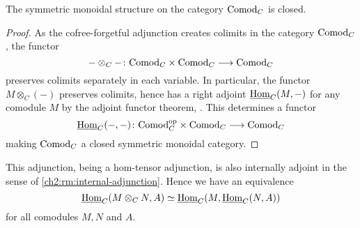 \begin{lemma}
    The symmetric monoidal structure on the category $\mathrm{Comod}_C$ is closed. 
\end{lemma}
\begin{proof}
    As the cofree-forgetful adjunction creates colimits in the category $\mathrm{Comod}_C$, the functor 
    \[-\otimes_C- \colon \mathrm{Comod}_C \times \mathrm{Comod}_C \longrightarrow \mathrm{Comod}_C\] 
    preserves colimits separately in each variable. In particular, the functor $M\otimes_C (-)$ preserves colimits, hence has a right adjoint $\operatorname{\underline{Hom}}_C(M,-)$ for any comodule $M$ by the adjoint functor theorem, \cite[5.5.2.9]{lurie_09}. This determines a functor 
    \[\operatorname{\underline{Hom}}_C(-,-)\colon \mathrm{Comod}_C^{\mathrm{op}}\times \mathrm{Comod}_C\longrightarrow \mathrm{Comod}_C\]
    making $\mathrm{Comod}_C$ a closed symmetric monoidal category.  
\end{proof}

\begin{remark}
    This adjunction, being a hom-tensor adjunction, is also internally adjoint in the sense of \cref{ch2:rm:internal-adjunction}. Hence we have an equivalence 
    \[\operatorname{\underline{Hom}}_C(M\otimes_C N, A) \simeq \operatorname{\underline{Hom}}_C(M, \operatorname{\underline{Hom}}_C(N, A))\]
    for all comodules $M, N$ and $A$. 
\end{remark}



